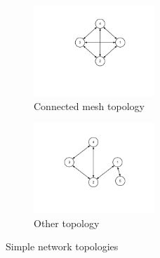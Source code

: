 \documentclass[12pt]{article}
\begin{document}
\begin{figure}[htp]
    \begin{subfigure}[b]{0.5\textwidth}
        \centering
        \includegraphics[clip,trim=45mm 45mm 45mm 20mm,width=0.5\textwidth]{images/con-mesh-topo.pdf}
        \caption{Connected mesh topology}
        \label{fig:con_mesh_topology}
    \end{subfigure}
    \begin{subfigure}[b]{0.5\textwidth}
        \centering
        \includegraphics[clip,trim=45mm 40mm 45mm 20mm,width=0.5\textwidth]{images/other-topo.pdf}
        \caption{Other topology}
        \label{fig:other_topology}
    \end{subfigure}
    \caption{Simple network topologies}
\end{figure}

\end{document}
